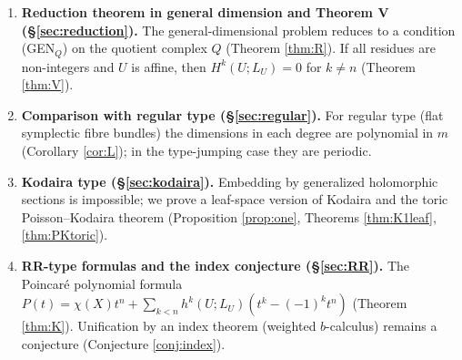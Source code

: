 \begin{enumerate}
\item[(6)] \textbf{Reduction theorem in general dimension and Theorem V (\S\ref{sec:reduction}).} The general-dimensional problem reduces to a condition (GEN$_Q$) on the quotient complex $Q$ (Theorem \ref{thm:R}). If all residues are non-integers and $U$ is affine, then $H^k(U;L_U)=0$ for $k\ne n$ (Theorem \ref{thm:V}).
\item[(7)] \textbf{Comparison with regular type (\S\ref{sec:regular}).} For regular type (flat symplectic fibre bundles) the dimensions in each degree are polynomial in $m$ (Corollary \ref{cor:L}); in the type-jumping case they are periodic.
\item[(8)] \textbf{Kodaira type (\S\ref{sec:kodaira}).} Embedding by generalized holomorphic sections is impossible; we prove a leaf-space version of Kodaira and the toric Poisson--Kodaira theorem (Proposition \ref{prop:one}, Theorems \ref{thm:K1leaf}, \ref{thm:PKtoric}).
\item[(9)] \textbf{RR-type formulas and the index conjecture (\S\ref{sec:RR}).} The Poincar\'e polynomial formula $P(t)=\chi(X)t^n+\sum_{k<n}h^k(U;L_U)(t^k-(-1)^kt^n)$ (Theorem \ref{thm:K}). Unification by an index theorem (weighted $b$-calculus) remains a conjecture (Conjecture \ref{conj:index}).
\end{enumerate}

